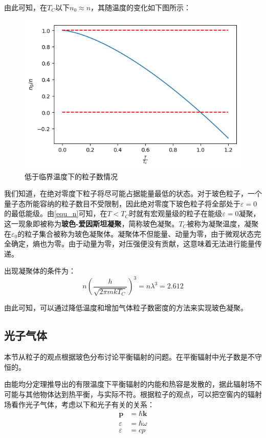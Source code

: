 \documentclass[UTF8]{ctexart}
\begin{document}
	由此可知，在$ T_{C} $以下$ n_{0} \approx n $，其随温度的变化如下图所示：
	\begin{figure}[ht]
		\centering
		\includegraphics[width=12cm]{Boas_mass.png}
		\caption{低于临界温度下的粒子数情况}
		\label{figure_Boas_mass}
	\end{figure}

	我们知道，在绝对零度下粒子将尽可能占据能量最低的状态。对于玻色粒子，一个量子态所能容纳的粒子数目不受限制，因此绝对零度下玻色粒子将全部处于$ \varepsilon=0 $的最低能级。由\ref{equ_n}可知，在$ T<T_{C} $时就有宏观量级的粒子在能级$ \varepsilon=0 $凝聚，这一现象即被称为\textbf{玻色-爱因斯坦凝聚}，简称玻色凝聚。$ T_{C} $被称为凝聚温度，凝聚在$ \varepsilon_{0} $的粒子集合被称为玻色凝聚体。凝聚体不但能量、动量为零，由于微观状态完全确定，熵也为零。由于动量为零，对压强便没有贡献，这意味着无法进行能量传递。
	
	出现凝聚体的条件为：
	\begin{equation}
		n \left(\frac{h}{\sqrt{2 \pi m k T_{C}}}\right)^{3}= n \lambda^{3} =2.612
	\end{equation}

\noindent 由此可知，可以通过降低温度和增加气体粒子数密度的方法来实现玻色凝聚。

	\subsection{光子气体}
	本节从粒子的观点根据玻色分布讨论平衡辐射的问题。在平衡辐射中光子数是不守恒的。
	
	由能均分定理推导出的有限温度下平衡辐射的内能和热容是发散的，据此辐射场不可能与其他物体达到热平衡，与实际不符。根据粒子的观点，可以把空窖内的辐射场看作光子气体，考虑以下和光子有关的关系：
	\begin{equation}
		\begin{aligned}
		\mathbf{p}&=\hbar \mathbf{k}\\
		\varepsilon&=\hbar \omega\\
		\varepsilon&=c p
		\end{aligned}
		\label{equ_photon}
	\end{equation}
	
\end{document}
